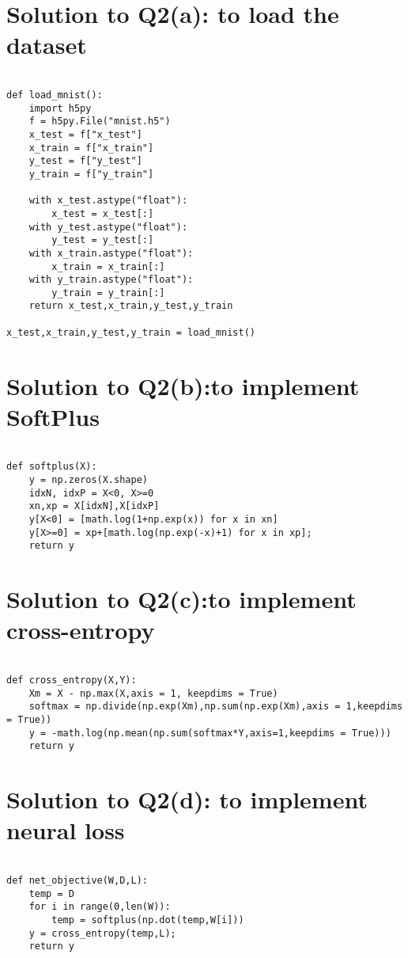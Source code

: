 \documentclass{article}
\begin{document}
\section*{Solution to Q2(a): to load the dataset}
\begin{verbatim}

def load_mnist():
    import h5py
    f = h5py.File("mnist.h5")
    x_test = f["x_test"]
    x_train = f["x_train"]
    y_test = f["y_test"]
    y_train = f["y_train"]

    with x_test.astype("float"):
        x_test = x_test[:]
    with y_test.astype("float"):
        y_test = y_test[:]
    with x_train.astype("float"):
        x_train = x_train[:]
    with y_train.astype("float"):
        y_train = y_train[:]
    return x_test,x_train,y_test,y_train

x_test,x_train,y_test,y_train = load_mnist()

\end{verbatim}

\section*{Solution to Q2(b):to implement SoftPlus}
\begin{verbatim}

def softplus(X):
    y = np.zeros(X.shape)
    idxN, idxP = X<0, X>=0
    xn,xp = X[idxN],X[idxP]
    y[X<0] = [math.log(1+np.exp(x)) for x in xn]
    y[X>=0] = xp+[math.log(np.exp(-x)+1) for x in xp];
    return y

\end{verbatim}
\section*{Solution to Q2(c):to implement cross-entropy}
\begin{verbatim}

def cross_entropy(X,Y):
    Xm = X - np.max(X,axis = 1, keepdims = True)
    softmax = np.divide(np.exp(Xm),np.sum(np.exp(Xm),axis = 1,keepdims = True))
    y = -math.log(np.mean(np.sum(softmax*Y,axis=1,keepdims = True)))
    return y

\end{verbatim}

\section*{Solution to Q2(d): to implement neural  loss}
\begin{verbatim}

def net_objective(W,D,L):
    temp = D
    for i in range(0,len(W)):
        temp = softplus(np.dot(temp,W[i]))
    y = cross_entropy(temp,L);
    return y

\end{verbatim}
\end{document}
